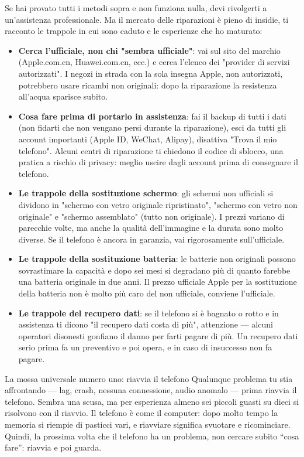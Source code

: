 
Se hai provato tutti i metodi sopra e non funziona nulla, devi rivolgerti a un'assistenza professionale. Ma il mercato delle riparazioni è pieno di insidie, ti racconto le trappole in cui sono caduto e le esperienze che ho maturato:

\begin{itemize}
  \item \textbf{Cerca l'ufficiale, non chi "sembra ufficiale"}: vai sul sito del marchio (Apple.com.cn, Huawei.com.cn, ecc.) e cerca l'elenco dei "provider di servizi autorizzati". I negozi in strada con la sola insegna Apple, non autorizzati, potrebbero usare ricambi non originali: dopo la riparazione la resistenza all'acqua sparisce subito.
  \item \textbf{Cosa fare prima di portarlo in assistenza}: fai il backup di tutti i dati (non fidarti che non vengano persi durante la riparazione), esci da tutti gli account importanti (Apple ID, WeChat, Alipay), disattiva "Trova il mio telefono". Alcuni centri di riparazione ti chiedono il codice di sblocco, una pratica a rischio di privacy: meglio uscire dagli account prima di consegnare il telefono.
  \item \textbf{Le trappole della sostituzione schermo}: gli schermi non ufficiali si dividono in "schermo con vetro originale ripristinato", "schermo con vetro non originale" e "schermo assemblato" (tutto non originale). I prezzi variano di parecchie volte, ma anche la qualità dell'immagine e la durata sono molto diverse. Se il telefono è ancora in garanzia, vai rigorosamente sull'ufficiale.
  \item \textbf{Le trappole della sostituzione batteria}: le batterie non originali possono sovrastimare la capacità e dopo sei mesi si degradano più di quanto farebbe una batteria originale in due anni. Il prezzo ufficiale Apple per la sostituzione della batteria non è molto più caro del non ufficiale, conviene l'ufficiale.
  \item \textbf{Le trappole del recupero dati}: se il telefono si è bagnato o rotto e in assistenza ti dicono "il recupero dati costa di più", attenzione — alcuni operatori disonesti gonfiano il danno per farti pagare di più. Un recupero dati serio prima fa un preventivo e poi opera, e in caso di insuccesso non fa pagare.
\end{itemize}

\begin{tcbwarn}{La mossa universale numero uno: riavvia il telefono}
Qualunque problema tu stia affrontando — lag, crash, nessuna connessione, audio anomalo — prima riavvia il telefono. Sembra una scusa, ma per esperienza almeno sei piccoli guasti su dieci si risolvono con il riavvio. Il telefono è come il computer: dopo molto tempo la memoria si riempie di pasticci vari, e riavviare significa svuotare e ricominciare. Quindi, la prossima volta che il telefono ha un problema, non cercare subito “cosa fare”: riavvia e poi guarda.

\end{tcbwarn}

